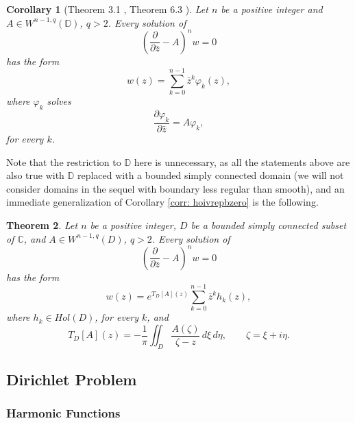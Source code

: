 \documentclass[12pt,reqno]{amsart}
\newtheorem{theorem}{Theorem}[section]
\newtheorem{corr}[theorem]{Corollary}
\theoremstyle{definition}
\theoremstyle{remark}
\newcommand{\p}{\partial}
\newcommand{\z}{\bar z}
\newcommand{\disk}{\mathbb{D}}
\begin{document}
            \begin{corr}[Theorem 3.1 \cite{WBD}, Theorem 6.3 \cite{BCHoiv}] \label{cor: altbzerohoivrep}
                Let $n$ be a positive integer and $A \in W^{n-1, q}(\disk)$, $q>2$. Every solution of 
                \[
                     \left( \frac{\p}{\p\z} - A \right)^n w = 0
                \]  
                has the form 
                \[
                    w(z) = \sum_{k=0}^{n-1} \z^k \varphi_k(z),
                \]
                where $\varphi_k$ solves
                \[
                    \frac{\p \varphi_k}{\p\z} = A\varphi_k,
                \] 
                for every $k$. 
            \end{corr}
            

            Note that the restriction to $\disk$ here is unnecessary, as all the statements above are also true with $\disk$ replaced with a bounded simply connected domain (we will not consider domains in the sequel with boundary less regular than smooth), and an immediate generalization of Corollary \ref{corr: hoivrepbzero} is the following.

            \begin{theorem}\label{thm: hoivrepgendom}
                Let $n$ be a positive integer, $D$ be a bounded simply connected subset of $\mathbb{C}$, and $A \in W^{n-1, q}(D)$, $q>2$. Every solution of 
                \[
                     \left( \frac{\p}{\p\z} - A \right)^n w = 0
                \]  
                has the form 
                \[
                    w(z) = e^{T_D[A](z)}\sum_{k=0}^{n-1} \z^k h_k(z),
                \]
                where $h_k \in Hol(D)$, for every $k$, and 
                \[
                    T_D[A](z) = -\frac{1}{\pi} \iint_D \frac{A(\zeta)}{\zeta - z} \,d\xi\,d\eta, \quad\quad \zeta = \xi + i\eta.
                \]         
            \end{theorem}

          


    \subsection{Dirichlet Problem}

        \subsubsection{Harmonic Functions}
\end{document}
